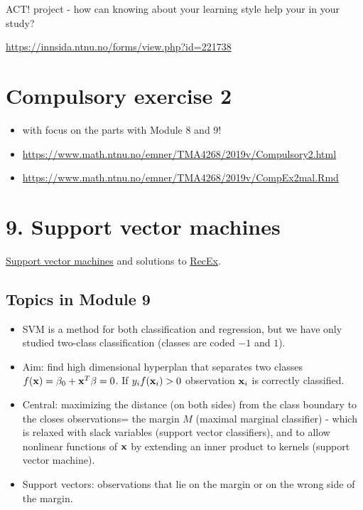 \documentclass[]{article}
\providecommand{\tightlist}{%
  \setlength{\itemsep}{0pt}\setlength{\parskip}{0pt}}
\begin{document}
ACT! project - how can knowing about your learning style help your in
your study?

\url{https://innsida.ntnu.no/forms/view.php?id=221738}

\section{Compulsory exercise 2}\label{compulsory-exercise-2}

\begin{itemize}
\item
  with focus on the parts with Module 8 and 9!
\item
  \url{https://www.math.ntnu.no/emner/TMA4268/2019v/Compulsory2.html}
\item
  \url{https://www.math.ntnu.no/emner/TMA4268/2019v/CompEx2mal.Rmd}
\end{itemize}

\section{9. Support vector machines}\label{support-vector-machines}

\href{https://www.math.ntnu.no/emner/TMA4268/2019v/9SVM/9SVM.html}{Support
vector machines} and solutions to
\href{https://www.math.ntnu.no/emner/TMA4268/2019v/9SVM/9SVM-sol.html}{RecEx}.

\subsection{Topics in Module 9}\label{topics-in-module-9}

\begin{itemize}
\tightlist
\item
  SVM is a method for both classification and regression, but we have
  only studied two-class classification (classes are coded \(-1\) and
  \(1\)).
\item
  Aim: find high dimensional hyperplan that separates two classes
  \(f({\bf x})=\beta_0+{\bf x}^T \mathbf\beta=0\). If
  \(y_if({\bf x}_i)>0\) observation \({\bf x}_i\) is correctly
  classified.
\item
  Central: maximizing the distance (on both sides) from the class
  boundary to the closes observations= the margin \(M\) (maximal
  marginal classifier) - which is relaxed with slack variables (support
  vector classifiers), and to allow nonlinear functions of \({\bf x}\)
  by extending an inner product to kernels (support vector machine).
\item
  Support vectors: observations that lie on the margin or on the wrong
  side of the margin.
\end{itemize}
\end{document}
